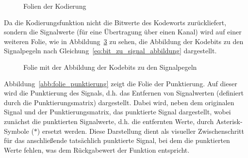 \begin{figure}[th]
\begin{subfigure}{0.7\textwidth}
		\caption{}
		\label{abb:folie_kodierung_3}
	\end{subfigure}
	\caption{Folien der Kodierung}
	\label{abb:folie_kodierung}
\end{figure}
Da die Kodierungsfunktion nicht die Bitwerte des Kodeworts zurückliefert, sondern die Signalwerte (für eine Übertragung über einen Kanal) wird auf einer weiteren Folie, wie in Abbildung~\ref{abb:folie_bit_zu_signal_abbildung} zu sehen, die Abbildung der Kodebits zu den Signalpegeln nach Gleichung~\eqref{eq:bit_zu_signal_abbildung} dargestellt.
\begin{figure}[th]
	\centering
	\caption{Folie mit der Abbildung der Kodebits zu den Signalpegeln}
	\label{abb:folie_bit_zu_signal_abbildung}
\end{figure}
Abbildung~\ref{abb:folie_punktierung} zeigt die Folie der Punktierung. Auf dieser wird die Punktierung des Signals, d.h. das Entfernen von Signalwerten (definiert durch die Punktierungsmatrix) dargestellt. Dabei wird, neben dem originalen Signal und der Punktierungsmatrix, das punktierte Signal dargestellt, wobei zunächst die punktierten Signalwerte, d.h. die entfernten Werte, durch Asterisk-Symbole ($\ast$) ersetzt werden. Diese Darstellung dient als visueller Zwischenschritt für das anschließende tatsächlich punktierte Signal, bei dem die punktierten Werte fehlen, was dem Rückgabewert der Funktion entspricht.
